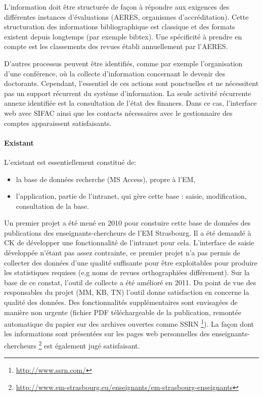 \documentclass{book}
\begin{document}
L'information doit être structurée de façon à répondre aux exigences des 
différentes instances d'évaluations (AERES, organismes d'accréditation).
Cette structuration des informations bibliographique est classique et des
formats existent depuis longtemps (par exemple bibtex). Une spécificité
à prendre en compte est les classements des revues établi annuellement par 
l'AERES.

D'autres processus peuvent être identifiés, comme par exemple l'organisation
d'une conférence, où la collecte d'information concernant le devenir des
doctorants. Cependant, l'essentiel de ces actions sont ponctuelles et ne 
nécessitent pas un support récurrent du système d'information. La seule 
activité récurrente annexe identifiée est la consultation de l'état des 
finances. Dans ce cas, l'interface web avec SIFAC ainsi que les contacts 
nécessaires avec le gestionnaire des comptes apparaissent satisfaisants.



\paragraph{Existant}
L'existant est essentiellement constitué de:
\begin{itemize}
\item la base de données recherche (MS Access), propre à l'EM,
\item l'application, partie de l'intranet, qui gère cette base : saisie, 
modification, consultation de la base.
\end{itemize}
Un premier projet a été mené en 2010 pour constuire cette base de données des
publications des enseignants-chercheurs de l'EM Strasbourg. Il a été demandé à 
CK de développer une fonctionnalité de l'intranet pour cela. L'interface de 
saisie développée n'étant pas assez contrainte, ce premier projet n'a pas 
permis de collecter des données d'une qualité suffisante pour être exploitables
pour produire les statistiques requises (e.g noms de revues orthographiées 
différement). Sur la base de ce constat, l'outil de collecte a été amélioré en 
2011. Du point de vue des responsables du projet (MM, KB, TN) l'outil donne 
satisfaction en concerne la qualité des données. Des fonctionnalités supplémentaires 
sont envisagées de manière non urgente (fichier PDF téléchargeable de la publication,
remontée automatique du papier sur des archives ouvertes comme SSRN%
\footnote{\url{ http://www.ssrn.com/}}).
La façon dont les informations sont présentées sur les pages web personnelles
des enseignants-chercheurs%
\footnote{\url{http://www.em-strasbourg.eu/enseignants/em-strasbourg-enseignants}}
est également jugé satisfaisant.
\end{document}
